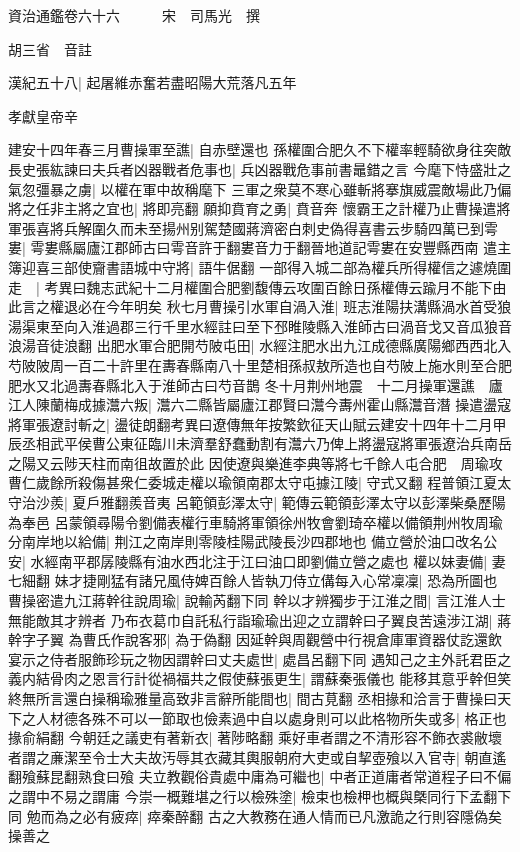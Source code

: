 資治通鑑卷六十六　　　宋　司馬光　撰

胡三省　音註

漢紀五十八|{
	起屠維赤奮若盡昭陽大荒落凡五年}


孝獻皇帝辛

建安十四年春三月曹操軍至譙|{
	自赤壁還也}
孫權圍合肥久不下權率輕騎欲身往突敵長史張紘諫曰夫兵者凶器戰者危事也|{
	兵凶器戰危事前書鼂錯之言}
今麾下恃盛壯之氣忽彊暴之虜|{
	以權在軍中故稱麾下}
三軍之衆莫不寒心雖斬將搴旗威震敵場此乃偏將之任非主將之宜也|{
	將即亮翻}
願抑賁育之勇|{
	賁音奔}
懷霸王之計權乃止曹操遣將軍張喜將兵解圍久而未至揚州别駕楚國蔣濟密白刺史偽得喜書云步騎四萬已到雩婁|{
	雩婁縣屬廬江郡師古曰雩音許于翻婁音力于翻晉地道記雩婁在安豐縣西南}
遣主簿迎喜三部使齎書語城中守將|{
	語牛倨翻}
一部得入城二部為權兵所得權信之遽燒圍走　|{
	考異曰魏志武紀十二月權圍合肥劉馥傳云攻圍百餘日孫權傳云踰月不能下由此言之權退必在今年明矣}
秋七月曹操引水軍自渦入淮|{
	班志淮陽扶溝縣渦水首受狼湯渠東至向入淮過郡三行千里水經註曰至下邳睢陵縣入淮師古曰渦音戈又音瓜狼音浪湯音徒浪翻}
出肥水軍合肥開芍陂屯田|{
	水經注肥水出九江成德縣廣陽鄉西西北入芍陂陂周一百二十許里在夀春縣南八十里楚相孫叔敖所造也自芍陂上施水則至合肥肥水又北過夀春縣北入于淮師古曰芍音鵲}
冬十月荆州地震　十二月操軍還譙　廬江人陳蘭梅成據灊六叛|{
	灊六二縣皆屬廬江郡賢曰灊今夀州霍山縣灊音潛}
操遣盪寇將軍張遼討斬之|{
	盪徒朗翻考異曰遼傳無年按繁欽征天山賦云建安十四年十二月甲辰丞相武平侯曹公東征臨川未濟羣舒蠢動割有灊六乃俾上將盪寇將軍張遼治兵南岳之陽又云陟天柱而南徂故置於此}
因使遼與樂進李典等將七千餘人屯合肥　周瑜攻曹仁歲餘所殺傷甚衆仁委城走權以瑜領南郡太守屯據江陵|{
	守式又翻}
程普領江夏太守治沙羨|{
	夏戶雅翻羨音夷}
呂範領彭澤太守|{
	範傳云範領彭澤太守以彭澤柴桑歷陽為奉邑}
呂蒙領尋陽令劉備表權行車騎將軍領徐州牧會劉琦卒權以備領荆州牧周瑜分南岸地以給備|{
	荆江之南岸則零陵桂陽武陵長沙四郡地也}
備立營於油口改名公安|{
	水經南平郡孱陵縣有油水西北注于江曰油口即劉備立營之處也}
權以妹妻備|{
	妻七細翻}
妹才捷剛猛有諸兄風侍婢百餘人皆執刀侍立傋每入心常凜凜|{
	恐為所圖也}
曹操密遣九江蔣幹往說周瑜|{
	說輸芮翻下同}
幹以才辨獨步于江淮之間|{
	言江淮人士無能敵其才辨者}
乃布衣葛巾自託私行詣瑜瑜出迎之立謂幹曰子翼良苦遠涉江湖|{
	蔣幹字子翼}
為曹氏作說客邪|{
	為于偽翻}
因延幹與周觀營中行視倉庫軍資器仗訖還飲宴示之侍者服飾珍玩之物因謂幹曰丈夫處世|{
	處昌呂翻下同}
遇知己之主外託君臣之義内結骨肉之恩言行計從禍福共之假使蘇張更生|{
	謂蘇秦張儀也}
能移其意乎幹但笑終無所言還白操稱瑜雅量高致非言辭所能間也|{
	間古莧翻}
丞相掾和洽言于曹操曰天下之人材德各殊不可以一節取也儉素過中自以處身則可以此格物所失或多|{
	格正也掾俞絹翻}
今朝廷之議吏有著新衣|{
	著陟略翻}
乘好車者謂之不清形容不飾衣裘敝壞者謂之亷潔至令士大夫故汚辱其衣藏其輿服朝府大吏或自挈壺飱以入官寺|{
	朝直遙翻飱蘇昆翻熟食曰飱}
夫立教觀俗貴處中庸為可繼也|{
	中者正道庸者常道程子曰不偏之謂中不易之謂庸}
今崇一概難堪之行以檢殊塗|{
	檢束也檢柙也概與槩同行下孟翻下同}
勉而為之必有疲瘁|{
	瘁秦醉翻}
古之大教務在通人情而已凡激詭之行則容隱偽矣操善之

